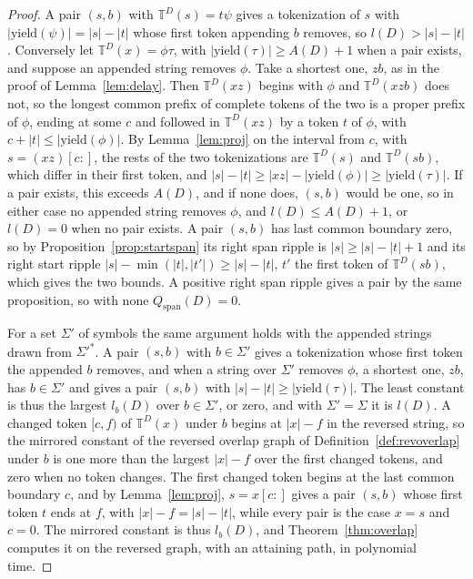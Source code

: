 \documentclass[11pt,a4paper]{article}
\theoremstyle{definition}
\theoremstyle{plain}
\newcommand{\T}{\mathbb{T}}
\newcommand{\yield}{\mathrm{yield}}
\begin{document}
\begin{proof}
A pair \((s, b)\) with \(\T^D(s) = t\psi\) gives a tokenization of \(s\) with \(|\yield(\psi)| = |s| - |t|\) whose first
token appending \(b\) removes, so \(l(D) > |s| - |t|\). Conversely let \(\T^D(x) = \phi\tau\), with
\(|\yield(\tau)| \ge A(D) + 1\) when a pair exists, and suppose an appended string removes \(\phi\). Take a shortest
one, \(zb\), as in the proof of Lemma~\ref{lem:delay}. Then \(\T^D(xz)\) begins with \(\phi\) and \(\T^D(xzb)\) does
not, so the longest common prefix of complete tokens of the two is a proper prefix of \(\phi\), ending at some \(c\) and
followed in \(\T^D(xz)\) by a token \(t\) of \(\phi\), with \(c + |t| \le |\yield(\phi)|\). By Lemma~\ref{lem:proj} on
the interval from \(c\), with \(s = (xz)[c{:}]\), the rests of the two tokenizations are \(\T^D(s)\) and \(\T^D(sb)\),
which differ in their first token, and \(|s| - |t| \ge |xz| - |\yield(\phi)| \ge |\yield(\tau)|\). If a pair exists,
this exceeds \(A(D)\), and if none does, \((s, b)\) would be one, so in either case no appended string removes \(\phi\),
and \(l(D) \le A(D) + 1\), or \(l(D) = 0\) when no pair exists. A pair \((s, b)\) has last common boundary zero, so by
Proposition~\ref{prop:startspan} its right span ripple is \(|s| \ge |s| - |t| + 1\) and its right start ripple
\(|s| - \min(|t|, |t'|) \ge |s| - |t|\), \(t'\) the first token of \(\T^D(sb)\), which gives the two bounds. A positive
right span ripple gives a pair by the same proposition, so with none \(Q_{\mathrm{span}}(D) = 0\).

For a set \(\Sigma'\) of symbols the same argument holds with the appended strings drawn from \(\Sigma'^*\). A pair
\((s, b)\) with \(b \in \Sigma'\) gives a tokenization whose first token the appended \(b\) removes, and when a string
over \(\Sigma'\) removes \(\phi\), a shortest one, \(zb\), has \(b \in \Sigma'\) and gives a pair \((s, b)\) with
\(|s| - |t| \ge |\yield(\tau)|\). The least constant is thus the largest \(l_b(D)\) over \(b \in \Sigma'\), or zero, and
with \(\Sigma' = \Sigma\) it is \(l(D)\). A changed token \([c, f)\) of \(\T^D(x)\) under \(b\) begins at \(|x| - f\) in
the reversed string, so the mirrored constant of the reversed overlap graph of Definition~\ref{def:revoverlap} under
\(b\) is one more than the largest \(|x| - f\) over the first changed tokens, and zero when no token changes. The first
changed token begins at the last common boundary \(c\), and by Lemma~\ref{lem:proj}, \(s = x[c{:}]\) gives a pair
\((s, b)\) whose first token \(t\) ends at \(f\), with \(|x| - f = |s| - |t|\), while every pair is the case \(x = s\)
and \(c = 0\). The mirrored constant is thus \(l_b(D)\), and Theorem~\ref{thm:overlap} computes it on the reversed
graph, with an attaining path, in polynomial time.


\end{proof}
\end{document}
